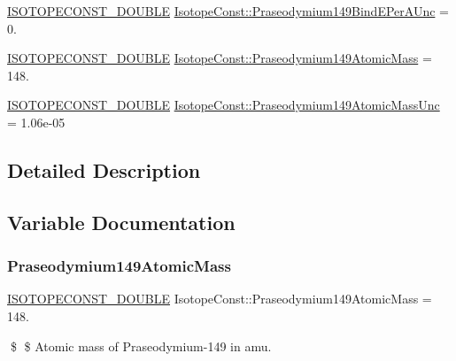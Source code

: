 \begin{DoxyCompactItemize}
\item 
\mbox{\hyperlink{group___isotope_const-_macros_ga8f45a7272ce02c0b4c65c44636ed719a}{I\+S\+O\+T\+O\+P\+E\+C\+O\+N\+S\+T\+\_\+\+D\+O\+U\+B\+LE}} \mbox{\hyperlink{group___isotope_const-_praseodymium-_pr149_ga2246f1c4dda8e8e16ad066316a37b25d}{Isotope\+Const\+::\+Praseodymium149\+Bind\+E\+Per\+A\+Unc}} = 0.
\item 
\mbox{\hyperlink{group___isotope_const-_macros_ga8f45a7272ce02c0b4c65c44636ed719a}{I\+S\+O\+T\+O\+P\+E\+C\+O\+N\+S\+T\+\_\+\+D\+O\+U\+B\+LE}} \mbox{\hyperlink{group___isotope_const-_praseodymium-_pr149_ga7cf81b4f9d2b4b3731aa5621034e945a}{Isotope\+Const\+::\+Praseodymium149\+Atomic\+Mass}} = 148.
\item 
\mbox{\hyperlink{group___isotope_const-_macros_ga8f45a7272ce02c0b4c65c44636ed719a}{I\+S\+O\+T\+O\+P\+E\+C\+O\+N\+S\+T\+\_\+\+D\+O\+U\+B\+LE}} \mbox{\hyperlink{group___isotope_const-_praseodymium-_pr149_ga0cdf3d0effd64f13d748faf227fddb13}{Isotope\+Const\+::\+Praseodymium149\+Atomic\+Mass\+Unc}} = 1.\+06e-\/05
\end{DoxyCompactItemize}


\subsection{Detailed Description}


\subsection{Variable Documentation}
\mbox{\label{group___isotope_const-_praseodymium-_pr149_ga7cf81b4f9d2b4b3731aa5621034e945a}} 
\subsubsection{\texorpdfstring{Praseodymium149\+Atomic\+Mass}{Praseodymium149AtomicMass}}
{\footnotesize\ttfamily \mbox{\hyperlink{group___isotope_const-_macros_ga8f45a7272ce02c0b4c65c44636ed719a}{I\+S\+O\+T\+O\+P\+E\+C\+O\+N\+S\+T\+\_\+\+D\+O\+U\+B\+LE}} Isotope\+Const\+::\+Praseodymium149\+Atomic\+Mass = 148.}

\$ \$ Atomic mass of Praseodymium-\/149 in amu. \mbox{\label{group___isotope_const-_praseodymium-_pr149_ga0cdf3d0effd64f13d748faf227fddb13}} 
